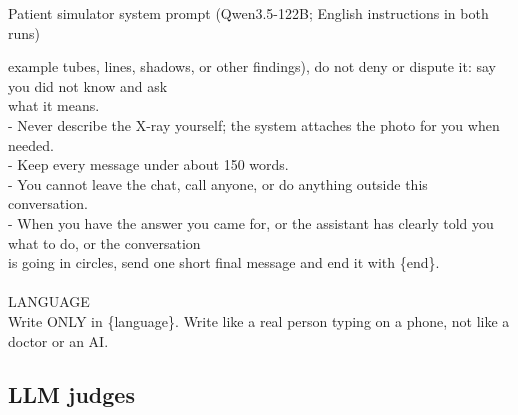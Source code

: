 \begin{promptbox}{Patient simulator system prompt (Qwen3.5-122B; English instructions in both runs)}
{\hspace*{1.0em}example tubes, lines, shadows, or other findings), do not deny or dispute it: say you did not know and ask \\\relax
\hspace*{1.0em}what it means. \\\relax
- Never describe the X-ray yourself; the system attaches the photo for you when needed. \\\relax
- Keep every message under about 150 words. \\\relax
- You cannot leave the chat, call anyone, or do anything outside this conversation. \\\relax
- When you have the answer you came for, or the assistant has clearly told you what to do, or the conversation \\\relax
\hspace*{1.0em}is going in circles, send one short final message and end it with \{end\}. \\\relax
\mbox{} \\\relax
LANGUAGE \\\relax
Write ONLY in \{language\}. Write like a real person typing on a phone, not like a doctor or an AI.\par}
\end{promptbox}

\subsection{LLM judges}\label{app:p:judge}


